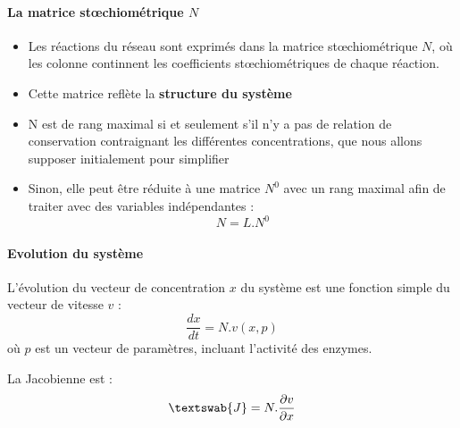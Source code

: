 \paragraph{La matrice stœchiométrique $N$}
\begin{itemize}
	\item Les réactions du réseau sont exprimés dans la matrice stœchiométrique $N$, où les colonne continnent les coefficients stœchiométriques de chaque réaction.
	\item Cette matrice reflète la \textbf{structure du système}
	\item N est de rang maximal si et seulement s'il n'y a pas de relation de conservation contraignant les différentes concentrations, que nous allons supposer initialement pour simplifier
	\item Sinon, elle peut être réduite à une matrice $N^0$ avec un rang maximal afin de traiter avec des variables indépendantes : $$ N=L.N^0 $$
\end{itemize}


\paragraph{Evolution du système}
L'évolution du vecteur de concentration $x$ du système est une fonction simple du vecteur de vitesse $v$ :
$$ \frac{dx}{dt}=N.v(x,p)$$ où $p$ est un vecteur de paramètres, incluant l'activité des enzymes.

La Jacobienne est :	$$ \textswab{J}  = N. \frac{ \partial v}{\partial x}     $$



